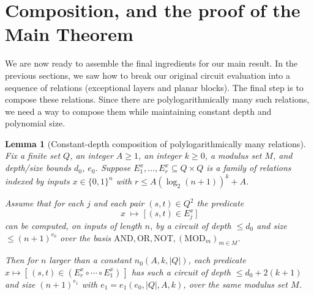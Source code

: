 \documentclass[11pt]{article}
\newtheorem{lemma}[theorem]{Lemma}
\theoremstyle{definition}
\theoremstyle{remark}
\newcommand{\comp}{\circ}
\begin{document}
\section{Composition, and the proof of the Main Theorem}\label{sec:composition}

We are now ready to assemble the final ingredients for our main result. In the previous sections, we saw how to break our original circuit evaluation into a sequence of relations (exceptional layers and planar blocks). The final step is to compose these relations. Since there are polylogarithmically many such relations, we need a way to compose them while maintaining constant depth and polynomial size.

\begin{lemma}[Constant-depth composition of polylogarithmically many
relations]\label{lem:compose}
Fix a finite set $Q$, an integer $A\ge1$, an integer $k\ge0$, a modulus set
$M$, and depth/size bounds $d_0$, $e_0$. Suppose $E^x_1,\dots,E^x_r\subseteq Q\times Q$
is a family of relations indexed by inputs $x\in\{0,1\}^n$ with $r\le A(\log_2(n+1))^{k}+A$.

Assume that for each $j$ and each pair $(s,t)\in Q^2$ the predicate
\[
x\;\longmapsto\;\bigl[\,(s,t)\in E^x_j\,\bigr]
\]
can be computed, on inputs of length $n$, by a circuit of depth $\le d_0$ and size
$\le(n+1)^{e_0}$ over the basis $\mathrm{AND},\mathrm{OR},\mathrm{NOT},
(\mathrm{MOD}_m)_{m\in M}$.

Then for $n$ larger than a
constant $n_0(A,k,|Q|)$, each predicate $x \mapsto [\,(s,t) \in (E^x_r\comp\cdots\comp E^x_1)\,]$ has such a circuit of depth $\le d_0+2(k+1)$ and
size $(n+1)^{e_1}$ with $e_1=e_1(e_0,|Q|,A,k)$, over the same modulus set $M$.
\end{lemma}
\end{document}
